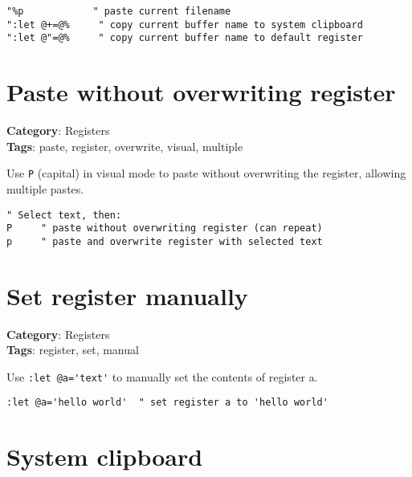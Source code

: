 {{{{{{{{{{{\begin{Exa*}{}
\begin{Verbatim}[fontsize=\footnotesize, breaklines, breakanywhere]
"%p            " paste current filename
":let @+=@%     " copy current buffer name to system clipboard
":let @"=@%     " copy current buffer name to default register
\end{Verbatim}
\end{Exa*}

\section{Paste without overwriting register}

\textbf{Category}: Registers\\ \textbf{Tags}: paste, register, overwrite, visual, multiple
\vspace{0.5cm}

Use {\footnotesize \Verb§P§} (capital) in visual mode to paste without overwriting the register, allowing multiple pastes.

\begin{Exa*}{}
\begin{Verbatim}[fontsize=\footnotesize, breaklines, breakanywhere]
" Select text, then:
P     " paste without overwriting register (can repeat)
p     " paste and overwrite register with selected text
\end{Verbatim}
\end{Exa*}

\section{Set register manually}

\textbf{Category}: Registers\\ \textbf{Tags}: register, set, manual
\vspace{0.5cm}

Use {\footnotesize \Verb§:let @a='text'§} to manually set the contents of register a.

\begin{Exa*}{}
\begin{Verbatim}[fontsize=\footnotesize, breaklines, breakanywhere]
:let @a='hello world'  " set register a to 'hello world'
\end{Verbatim}
\end{Exa*}

\section{System clipboard}

}}}}}}}}}}}
